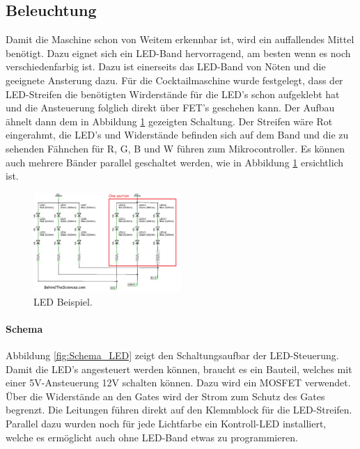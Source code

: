 \subsection{Beleuchtung}
\label{subsec:Beleuchtung_2}

Damit die Maschine schon von Weitem erkennbar ist, wird ein auffallendes Mittel benötigt. Dazu eignet sich ein LED-Band hervorragend, am besten wenn es noch verschiedenfarbig ist. Dazu ist einerseits das LED-Band von Nöten und die geeignete Ansterung dazu. Für die Cocktailmaschine wurde festgelegt, dass der LED-Streifen die benötigten Wirderstände für die LED's schon aufgeklebt hat und die Ansteuerung folglich direkt über FET's geschehen kann. Der Aufbau ähnelt dann dem in Abbildung \ref{fig:LED1} gezeigten Schaltung. Der Streifen wäre Rot eingerahmt, die LED's und Widerstände befinden sich auf dem Band und die zu sehenden Fähnchen für R, G, B und W führen zum Mikrocontroller. Es können auch mehrere Bänder parallel geschaltet werden, wie in Abbildung \ref{fig:LED1} ersichtlich ist.

\begin{figure}[h!]
\center
\includegraphics[width = 0.5\textwidth]{graphics/Schema_LED1}
\caption{LED Beispiel.}
\label{fig:LED1}
\end{figure}

\paragraph{Schema}\mbox{}

Abbildung \ref{fig:Schema_LED} zeigt den Schaltungsaufbar der LED-Steuerung. Damit die LED's angesteuert werden können, braucht es ein Bauteil, welches mit einer 5V-Ansteuerung 12V schalten können. Dazu wird ein MOSFET verwendet. Über die Widerstände an den Gates wird der Strom zum Schutz des Gates begrenzt. Die Leitungen führen direkt auf den Klemmblock für die LED-Streifen. Parallel dazu wurden noch für jede Lichtfarbe ein Kontroll-LED installiert, welche es ermöglicht auch ohne LED-Band etwas zu programmieren.

